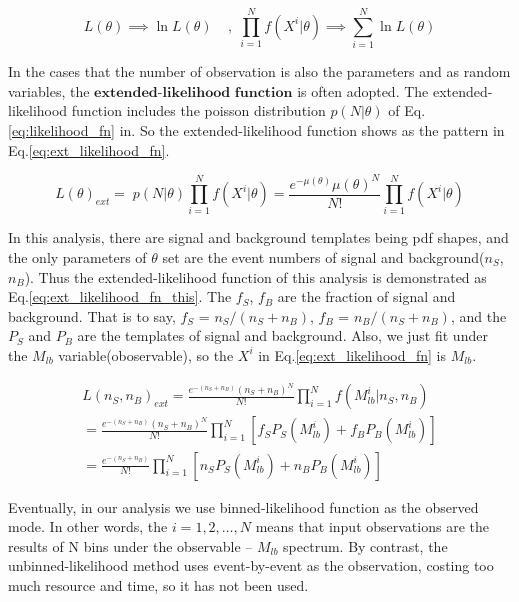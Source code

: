 		\begin{equation}
		L(\theta) \implies \ln{L(\theta)} \; \; \; \; , \; \prod_{i=1}^{N} f(X^i|\theta) \implies \sum_{i=1}^{N} \ln{L(\theta)}
		\label{eq:nature_log_L}
		\end{equation}

		In the cases that the number of observation is also the parameters and as random variables, the $\textbf{extended-likelihood function}$ is often adopted. The extended-likelihood function includes the poisson distribution $p(N|\theta)$ of Eq.\ref{eq:likelihood_fn} in. So the extended-likelihood function shows as the pattern in Eq.\ref{eq:ext_likelihood_fn}. 

		\begin{equation}
		L(\theta)_{ext} = 􏱛p(N|\theta) \prod_{i=1}^{N} f(X^i|\theta) = \frac{e^{-\mu(\theta)}\mu(\theta)^{N}}{N!} \prod_{i=1}^{N} f(X^i|\theta)
		\label{eq:ext_likelihood_fn}
		\end{equation}


		In this analysis, there are signal and background templates being pdf shapes, and the only parameters of $\theta$ set are the event numbers of signal and background($n_{S}$, $n_{B}$). Thus the extended-likelihood function of this analysis is demonstrated as Eq.\ref{eq:ext_likelihood_fn_this}. The $f_{S}$, $f_{B}$ are the fraction of signal and background. That is to say, $f_{S}$ = $n_{S}/(n_{S}+n_{B})$, $f_{B}$ = $n_{B}/(n_{S}+n_{B})$, and the $P_{S}$ and $P_{B}$ are the templates of signal and background. Also, we just fit under the $M_{lb}$ variable(oboservable), so the $X^i$ in Eq.\ref{eq:ext_likelihood_fn} is $M_{lb}$.

		
		\begin{equation}
		\begin{split}
		L(n_{S},n_{B})_{ext} = \frac{e^{-(n_{S}+n_{B})}(n_{S}+n_{B})^{N}}{N!} \prod_{i=1}^{N} f(M_{lb}^i|n_{S},n_{B}) \\
		= \frac{e^{-(n_{S}+n_{B})}(n_{S}+n_{B})^{N}}{N!} \prod_{i=1}^{N} [f_{S}P_{S}(M_{lb}^i) + f_{B}P_{B}(M_{lb}^i)] \\
		 = \frac{e^{-(n_{S}+n_{B})}}{N!} \prod_{i=1}^{N} [n_{S}P_{S}(M_{lb}^i) + n_{B}P_{B}(M_{lb}^i)]
		\end{split}
		\label{eq:ext_likelihood_fn_this}
		\end{equation}

		Eventually, in our analysis we use binned-likelihood function as the observed mode. In other words, the $i=1,2,\ldots,N$ means that input observations are the results of N bins under the observable -- $M_{lb}$ spectrum. By contrast, the unbinned-likelihood method uses event-by-event as the observation, costing too much resource and time, so it has not been used.



